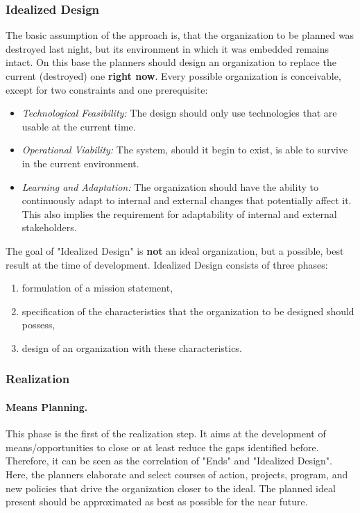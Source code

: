 \documentclass[a4paper,12pt]{article}
\begin{document}
\subsubsection{Idealized Design}
The basic assumption of the approach is, that the organization to be planned
was destroyed last night, but its environment in which it was embedded remains
intact. On this base the planners should design an organization to replace the
current (destroyed) one \textbf{right now}.  Every possible organization is
conceivable, except for two constraints and one prerequisite:

\begin{itemize}
\item \emph{Technological Feasibility:} The design should only use
  technologies that are usable at the current time.

\item \emph{Operational Viability:} The system, should it begin to exist, is
  able to survive in the current environment.

\item \emph{Learning and Adaptation:} The organization should have the ability
  to continuously adapt to internal and external changes that potentially
  affect it. This also implies the requirement for adaptability of internal
  and external stakeholders.
\end{itemize}

The goal of "Idealized Design" is \textbf{not} an ideal organization, but a
possible, best result at the time of development.  Idealized Design consists
of three phases:
\begin{enumerate}[noitemsep]
\item formulation of a mission statement,
\item specification of the characteristics that the organization to be
  designed should possess,
\item design of an organization with these characteristics.
\end{enumerate}

\subsubsection{Realization}

\paragraph{Means Planning.} 
This phase is the first of the realization step. It aims at the development of
means/opportunities to close or at least reduce the gaps identified before.
Therefore, it can be seen as the correlation of "Ends" and "Idealized Design".
Here, the planners elaborate and select courses of action, projects, program,
and new policies that drive the organization closer to the ideal.  The planned
ideal present should be approximated as best as possible for the near future.
\end{document}
